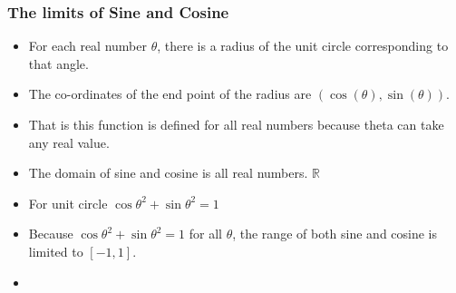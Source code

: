     \begin{frame}
        \frametitle{The limits of Sine and Cosine} 
        \begin{itemize}
            \item For each real number $\theta$, there is a radius of the unit circle corresponding to that angle.
            \item The co-ordinates of the end point of the radius are $(\cos(\theta), \sin(\theta))$.
            \item That is this function is defined for all real numbers because theta can take any real value. 
            \item The domain of sine and cosine is all real numbers. \(\mathbb{R}\) 
            \item For unit circle \( \cos \theta^{2} + \sin \theta^{2} = 1 \) 
            \item Because \( \cos \theta^{2} + \sin \theta^{2} = 1 \) for all \(\theta\), the range of both sine and cosine is limited to \([-1, 1]\).
            \item 
        \end{itemize}
    \end{frame}
